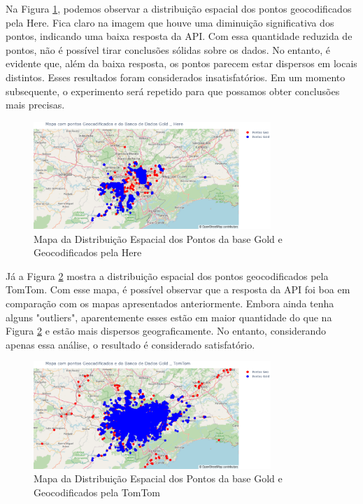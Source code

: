 Na Figura \ref{fig:mapapontos2}, podemos observar a distribuição espacial dos pontos geocodificados pela Here. Fica claro na imagem que houve uma diminuição significativa dos pontos, indicando uma baixa resposta da API. Com essa quantidade reduzida de pontos, não é possível tirar conclusões sólidas sobre os dados. No entanto, é evidente que, além da baixa resposta, os pontos parecem estar dispersos em locais distintos. Esses resultados foram considerados insatisfatórios. Em um momento subsequente, o experimento será repetido para que possamos obter conclusões mais precisas.

\begin{figure}[h]
  \centering
  \includegraphics[width=0.8\textwidth]{Figuras/mapapontos2.png}
  \caption{Mapa da Distribuição Espacial dos Pontos da base Gold e Geocodificados pela Here}
  \label{fig:mapapontos2}
\end{figure}

Já a Figura \ref{fig:mapapontos3} mostra a distribuição espacial dos pontos geocodificados pela TomTom. Com esse mapa, é possível observar que a resposta da API foi boa em comparação com os mapas apresentados anteriormente. Embora ainda tenha alguns "outliers", aparentemente esses estão em maior quantidade do que na Figura \ref{fig:mapapontos3} e estão mais dispersos geograficamente. No entanto, considerando apenas essa análise, o resultado é considerado satisfatório.

\begin{figure}[h]
  \centering
  \includegraphics[width=0.8\textwidth]{Figuras/mapapontos3.png}
  \caption{Mapa da Distribuição Espacial dos Pontos da base Gold e Geocodificados pela TomTom}
  \label{fig:mapapontos3}
\end{figure}



